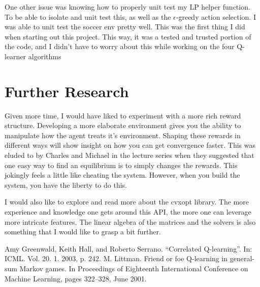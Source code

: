 \documentclass[conference]{IEEEtran}
\begin{document}
One other issue was knowing how to properly unit test my LP helper function. To be able to isolate and unit test this, as well as the $\epsilon$-greedy action selection. I was able to unit test the soccer env pretty well. This was the first thing I did when starting out this project. This way, it was a tested and trusted portion of the code, and I didn't have to worry about this while working on the four Q-learner algorithms

\section{Further Research}
Given more time, I would have liked to experiment with a more rich reward structure. Developing a more elaborate environment gives you the ability to manipulate how the agent treats it's environment. Shaping these rewards in different ways will show insight on how you can get convergence faster. This was eluded to by Charles and Michael in the lecture series when they suggested that one easy way to find an equilibrium is to simply changes the rewards. This jokingly feels a little like cheating the system. However, when you build the system, you have the liberty to do this.

I would also like to explore and read more about the cvxopt library. The more experience and knowledge one gets around this API, the more one can leverage more intricate features. The linear algebra of the matrices and the solvers is also something that I would like to grasp a bit further.

\begin{thebibliography}{00}
 Amy Greenwald, Keith Hall, and Roberto Serrano. “Correlated Q-learning”. In: ICML. Vol. 20. 1. 2003, p. 242.
 M. Littman. Friend or foe Q-learning in general-sum Markov games. In Proceedings of Eighteenth International Conference on Machine Learning, pages 322–328, June 2001.
\end{thebibliography}
\end{document}
